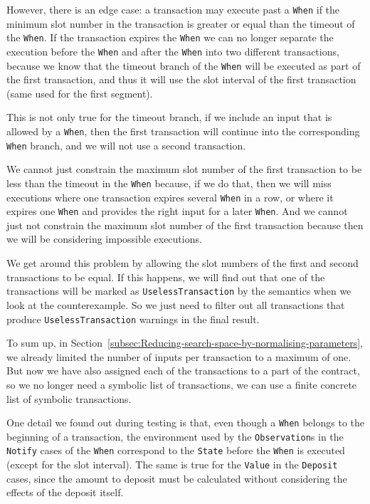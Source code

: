 \documentclass[english,runningheads]{llncs}
\begin{document}
However, there is an edge case: a transaction may execute past 
a \texttt{When} if the minimum slot number in the transaction is greater
or equal than the timeout of the \texttt{When}. If the transaction expires
the \texttt{When} we can no longer separate the execution before the
\texttt{When} and after the \texttt{When} into two different transactions,
because we know that the timeout branch of the \texttt{When} will be executed
as part of the first transaction, and thus it will use the slot interval
of the first transaction (same used for the first segment).

This is not only true for the timeout branch, if we include
an input that is allowed by a \texttt{When}, then the first transaction
will continue into the corresponding \texttt{When}
branch, and we will not use a second transaction.

We cannot just constrain the maximum slot number of the first transaction
to be less than the timeout in the \texttt{When} because, if we do
that, then we will miss executions where one transaction expires several
\texttt{When} in a row, or where it expires one \texttt{When} and provides
the right input for a later \texttt{When}. And we cannot just not constrain
the maximum slot number of the first transaction because then we will
be considering impossible executions.

We get around this problem by allowing the slot numbers of the first
and second transactions to be equal. If this happens, we will find
out that one of the transactions will be marked as \texttt{UselessTransaction}
by the semantics when we look at the counterexample. So we just need
to filter out all transactions that produce \texttt{UselessTransaction}
warnings in the final result.

To sum up, in Section~\ref{subsec:Reducing-search-space-by-normalising-parameters}, we already limited the number of inputs per transaction
to a maximum of one. But now we have also assigned each of the
transactions to a part of the contract, so we no longer need a symbolic
list of transactions, we can use a finite concrete list of symbolic
transactions.

One detail we found out during testing is that, even though a \texttt{When}
belongs to the beginning of a transaction, the environment used by
the \texttt{Observation}s in the \texttt{Notify} cases of the \texttt{When}
correspond to the \texttt{State} before the \texttt{When} is executed (except
for the slot interval). The same is true for the \texttt{Value} in the
\texttt{Deposit} cases, since the amount to deposit must be calculated without
considering the effects of the deposit itself.
\end{document}

